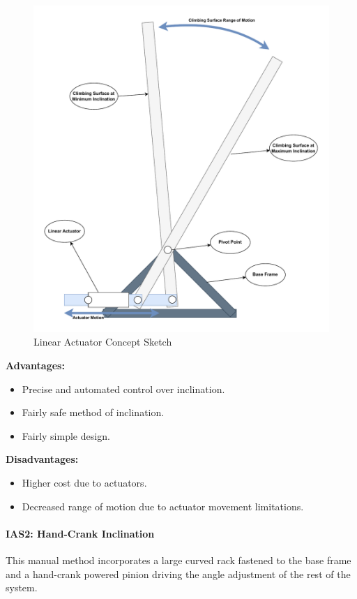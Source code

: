 \begin{figure}[H]
    \centering
    \includegraphics[width=0.6\linewidth]{figs/concept_design/Linear_Actuator_Concept.pdf}
    \caption{Linear Actuator Concept Sketch}
    \label{fig:linear-actuator-concept}
\end{figure}

\textbf{Advantages:}
\begin{itemize}
    \item Precise and automated control over inclination.
    \item Fairly safe method of inclination.
    \item Fairly simple design.
\end{itemize}

\textbf{Disadvantages:}
\begin{itemize}
    \item Higher cost due to actuators.
    \item Decreased range of motion due to actuator movement limitations.
\end{itemize}

\paragraph{IAS2: Hand-Crank Inclination}
This manual method incorporates a large curved rack fastened to the base frame and a hand-crank powered pinion driving the angle adjustment of the rest of the system.

